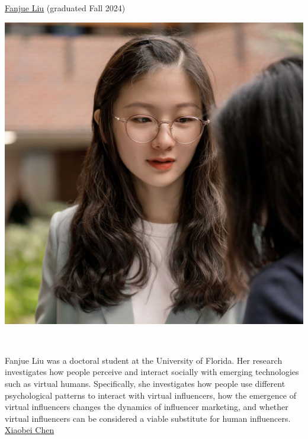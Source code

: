 \documentclass[]{article}
\begin{document}
\href{https://www.fanjueliu.com/}{Fanjue Liu} (graduated Fall 2024)

\includegraphics{images/fanjue.JPG}

~

Fanjue Liu was a doctoral student at the University of Florida. Her
research investigates how people perceive and interact socially with
emerging technologies such as virtual humans. Specifically, she
investigates how people use different psychological patterns to interact
with virtual influencers, how the emergence of virtual influencers
changes the dynamics of influencer marketing, and whether virtual
influencers can be considered a viable substitute for human
influencers.\\

\href{https://www.linkedin.com/in/xiaobei-chen/}{Xiaobei Chen}
\end{document}
